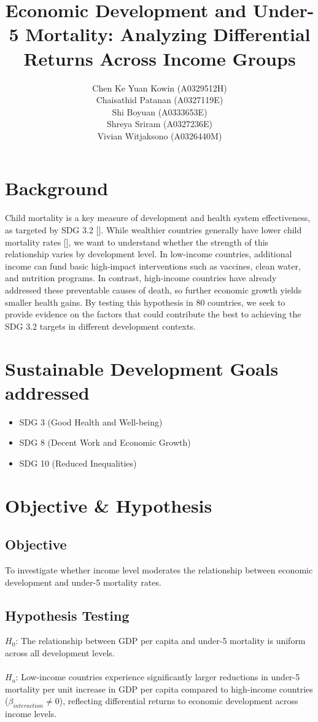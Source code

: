 \documentclass[10pt,a4paper]{article}
\title{Economic Development and Under-5 Mortality: Analyzing Differential Returns Across Income Groups}
\author{Chen Ke Yuan Kowin (A0329512H) \protect\\
Chaisathid Patanan (A0327119E) \protect\\
Shi Boyuan (A0333653E) \protect\\
Shreya Sriram (A0327236E) \protect\\
Vivian Witjaksono (A0326440M)}
\begin{document}
		
    \maketitle 

\section{Background}

Child mortality is a key measure of development and health system effectiveness, as targeted by SDG 3.2 [\cite{un2015sdg}]. While wealthier countries generally have lower child mortality rates [\cite{swift2018}], we want to understand whether the strength of this relationship varies by development level. In low-income countries, additional income can fund basic high-impact interventions such as vaccines, clean water, and nutrition programs. In contrast, high-income countries have already addressed these preventable causes of death, so further economic growth yields smaller health gains. By testing this hypothesis in 80 countries, we seek to provide evidence on the factors that could contribute the best to achieving the SDG 3.2 targets in different development contexts.

\section{Sustainable Development Goals addressed}

\begin{itemize}
    \item SDG 3 (Good Health and Well-being)
    \item SDG 8 (Decent Work and Economic Growth)
    \item SDG 10 (Reduced Inequalities)
\end{itemize} 

\section{Objective \& Hypothesis}

\subsection{Objective}
To investigate whether income level moderates the relationship between economic development and under-5 mortality rates.

\subsection{Hypothesis Testing}
$H_{0}$: The relationship between GDP per capita and under-5 mortality is uniform across all development levels.
\\
\\$H_{a}$: Low-income countries experience significantly larger reductions in under-5 mortality per unit increase in GDP per capita compared to high-income countries ($\beta_{interaction}\neq 0$), reflecting differential returns to economic development across income levels.
    
\end{document}
